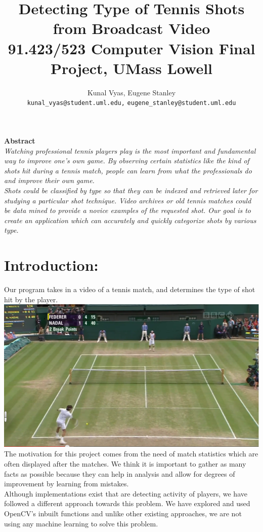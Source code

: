 \documentclass[10.5pt]{proc}
\begin{document}
\title{Detecting Type of Tennis Shots from Broadcast Video\\[5pt]
\small{91.423/523 Computer Vision Final Project, UMass Lowell}}
\author{Kunal Vyas, Eugene Stanley\\
  \texttt{kunal\_vyas@student.uml.edu,}
  \texttt{eugene\_stanley@student.uml.edu}}
  \date{\vspace{-1ex}}
  \maketitle
  
  \textbf{\large{Abstract}}\\[3pt]
  \emph{\normalsize{Watching professional tennis players play is the most important and fundamental way to improve one's own game. By observing certain statistics like the kind of shots hit during a tennis match, people can learn from what the professionals do and improve their own game.\\
    Shots could be classified by type so that they can be indexed and retrieved later for studying a particular shot technique. Video archives or old tennis matches could be data mined to provide a novice examples of the requested shot. Our goal is to create an application which can accurately and quickly categorize shots by various type.}}
  \section{Introduction:}
  Our program takes in a video of a tennis match, and determines the type of shot hit by the player. \\[4pt]
	\includegraphics[width=.47\textwidth]{forehand.png}
    The motivation for this project comes from the need of match statistics which are often displayed after the matches. We think it is important to gather as many facts as possible because they can help in analysis and allow for degrees of improvement by learning from mistakes.\\
	Although implementations exist that are detecting activity of players, we have followed a different approach towards this problem. We have explored and used OpenCV's inbuilt functions and unlike other existing approaches, we are not using any machine learning to solve this problem.
    
\end{document}
